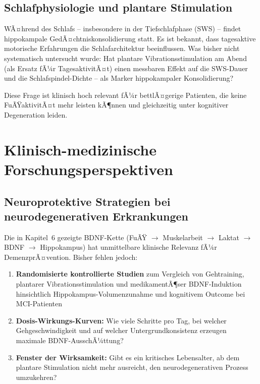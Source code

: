 ﻿\documentclass[12pt,a4paper]{report}
\theoremstyle{plain}
\theoremstyle{definition}
\theoremstyle{remark}
\begin{document}
\subsection{Schlafphysiologie und plantare Stimulation}

WÃ¤hrend des Schlafs -- insbesondere in der Tiefschlafphase (SWS) --
findet hippokampale GedÃ¤chtniskonsolidierung statt. Es ist bekannt,
dass tagesaktive motorische Erfahrungen die Schlafarchitektur
beeinflussen. Was bisher nicht systematisch untersucht wurde: Hat
plantare Vibrationsstimulation am Abend (als Ersatz fÃ¼r
TagesaktivitÃ¤t) einen messbaren Effekt auf die SWS-Dauer und die
Schlafspindel-Dichte -- als Marker hippokampaler Konsolidierung?

Diese Frage ist klinisch hoch relevant fÃ¼r bettlÃ¤gerige Patienten,
die keine FuÃŸaktivitÃ¤t mehr leisten kÃ¶nnen und gleichzeitig unter
kognitiver Degeneration leiden.

\section{Klinisch-medizinische Forschungsperspektiven}

\subsection{Neuroprotektive Strategien bei neurodegenerativen Erkrankungen}

Die in Kapitel~6 gezeigte BDNF-Kette (FuÃŸ $\to$ Muskelarbeit $\to$
Laktat $\to$ BDNF $\to$ Hippokampus) hat unmittelbare klinische
Relevanz fÃ¼r DemenzprÃ¤vention. Bisher fehlen jedoch:

\begin{enumerate}
\item \textbf{Randomisierte kontrollierte Studien} zum Vergleich
  von Gehtraining, plantarer Vibrationsstimulation und medikamentÃ¶ser
  BDNF-Induktion hinsichtlich Hippokampus-Volumenzunahme und
  kognitivem Outcome bei MCI-Patienten
\item \textbf{Dosis-Wirkungs-Kurven:} Wie viele Schritte pro Tag,
  bei welcher Gehgeschwindigkeit und auf welcher Untergrundkonsistenz
  erzeugen maximale BDNF-AusschÃ¼ttung?
\item \textbf{Fenster der Wirksamkeit:} Gibt es ein kritisches
  Lebensalter, ab dem plantare Stimulation nicht mehr ausreicht,
  den neurodegenerativen Prozess umzukehren?
\end{enumerate}
\end{document}
